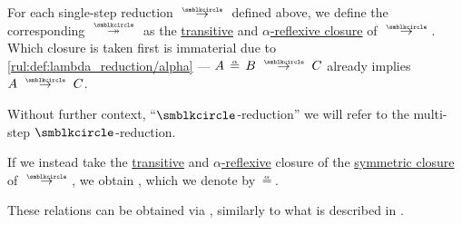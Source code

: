 \begin{definition}
\begin{thmenum}
     For each single-step reduction \( {\pred} \) defined above, we define the corresponding  \( {\pred*} \) as the \hyperref[def:relation_closures/transitive]{transitive} and \hyperref[def:alpha_reflexive]{\( \alpha \)-reflexive closure} of \( {\pred} \). Which closure is taken first is immaterial due to \ref{rul:def:lambda_reduction/alpha} --- \( A \aequiv B \pred C \) already implies \( A \pred C \).

    Without further context, \enquote{\( {\anon} \)-reduction} we will refer to the multi-step \( {\anon} \)-reduction.

     If we instead take the
    \hyperref[def:relation_closures/transitive]{transitive} and \hyperref[def:alpha_reflexive]{\( \alpha \)-reflexive} closure of the \hyperref[def:relation_closures/symmetric]{symmetric closure} of \( \pred \), we obtain , which we denote by \( {\requiv} \).
  \end{thmenum}
\end{definition}
\begin{comments}
  \item These relations can be obtained via , similarly to what is described in .
\end{comments}

